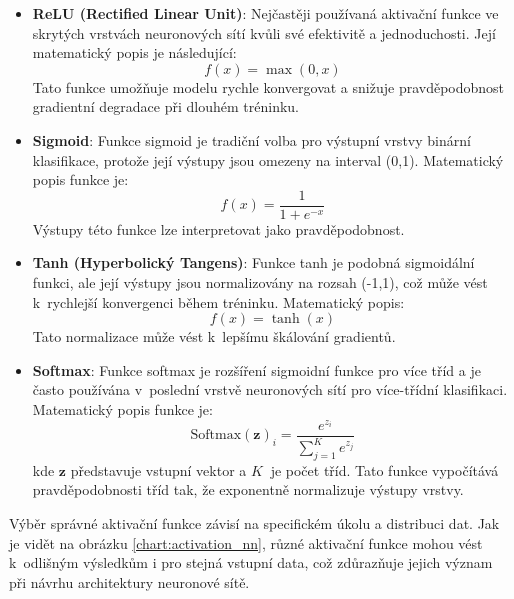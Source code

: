 \begin{itemize}
    \item \textbf{ReLU (Rectified Linear Unit)}: Nejčastěji používaná aktivační funkce ve skrytých vrstvách neuronových sítí kvůli své efektivitě a jednoduchosti. Její matematický popis je následující:
    \begin{equation}
        f(x) = \max(0, x)
    \end{equation}
    Tato funkce umožňuje modelu rychle konvergovat a snižuje pravděpodobnost gradientní degradace při dlouhém tréninku.
    
    \item \textbf{Sigmoid}: Funkce sigmoid je tradiční volba pro výstupní vrstvy binární klasifikace, protože její výstupy jsou omezeny na interval (0,1). Matematický popis funkce je:
    \begin{equation}
        f(x) = \frac{1}{1 + e^{-x}}
    \end{equation}
    Výstupy této funkce lze interpretovat jako pravděpodobnost.

    \item \textbf{Tanh (Hyperbolický Tangens)}: Funkce tanh je podobná sigmoidální funkci, ale její výstupy jsou normalizovány na rozsah (-1,1), což může vést k~rychlejší konvergenci během tréninku. Matematický popis:
    \begin{equation}
        f(x) = \tanh(x)
    \end{equation}
    Tato normalizace může vést k~lepšímu škálování gradientů.
    
    \item \textbf{Softmax}: Funkce softmax je rozšíření sigmoidní funkce pro více tříd a je často používána v~poslední vrstvě neuronových sítí pro více-třídní klasifikaci. Matematický popis funkce je:
    \begin{equation}
        \text{Softmax}(\mathbf{z})_i = \frac{e^{z_i}}{\sum_{j=1}^{K} e^{z_j}}
    \end{equation}
    kde \( \mathbf{z} \) představuje vstupní vektor a \( K~\) je počet tříd. Tato funkce vypočítává pravděpodobnosti tříd tak, že exponentně normalizuje výstupy vrstvy.
\end{itemize}


Výběr správné aktivační funkce závisí na specifickém úkolu a distribuci dat. Jak je vidět na obrázku \ref{chart:activation_nn}, různé aktivační funkce mohou vést k~odlišným výsledkům i pro stejná vstupní data, což zdůrazňuje jejich význam při návrhu architektury neuronové sítě.

